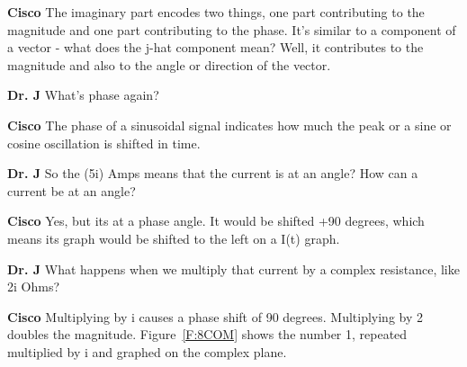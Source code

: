 \setlength{\hangindent}{30pt}\noindent \textbf{Cisco}
The imaginary part encodes two things, one part contributing to the magnitude and one part contributing to the phase. It's similar to a component of a vector - what does the j-hat component mean? Well, it contributes to the magnitude and also to the angle or direction of the vector.\par
\vspace{6pt}

\setlength{\hangindent}{30pt}\noindent \textbf{Dr. J}
What's phase again?\par
\vspace{6pt}

\setlength{\hangindent}{30pt}\noindent \textbf{Cisco}
The phase of a sinusoidal signal indicates how much the peak or a sine or cosine oscillation is shifted in time.\par
\vspace{6pt}

\setlength{\hangindent}{30pt}\noindent \textbf{Dr. J}
So the (5i) Amps means that the current is at an angle? How can a current be at an angle?\par
\vspace{6pt}

\setlength{\hangindent}{30pt}\noindent \textbf{Cisco}
Yes, but its at a phase angle. It would be shifted +90 degrees, which means its graph would be shifted to the left on a I(t) graph.\par
\vspace{6pt}

\setlength{\hangindent}{30pt}\noindent \textbf{Dr. J}
What happens when we multiply that current by a complex resistance, like 2i Ohms?\par
\vspace{6pt}

\setlength{\hangindent}{30pt}\noindent \textbf{Cisco}
Multiplying by i causes a phase shift of 90 degrees. Multiplying by 2 doubles the magnitude. Figure~\ref{F:8COM} shows the number 1, repeated multiplied by i and graphed on the complex plane.\par
\vspace{6pt}

